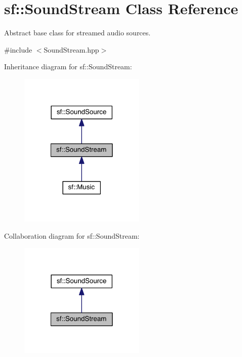 \hypertarget{classsf_1_1_sound_stream}{\section{sf\-:\-:Sound\-Stream Class Reference}
\label{classsf_1_1_sound_stream}
}


Abstract base class for streamed audio sources.  




{\ttfamily \#include $<$Sound\-Stream.\-hpp$>$}



Inheritance diagram for sf\-:\-:Sound\-Stream\-:
\nopagebreak
\begin{figure}[H]
\begin{center}
\leavevmode
\includegraphics[width=170pt]{classsf_1_1_sound_stream__inherit__graph}
\end{center}
\end{figure}


Collaboration diagram for sf\-:\-:Sound\-Stream\-:
\nopagebreak
\begin{figure}[H]
\begin{center}
\leavevmode
\includegraphics[width=170pt]{classsf_1_1_sound_stream__coll__graph}
\end{center}
\end{figure}
